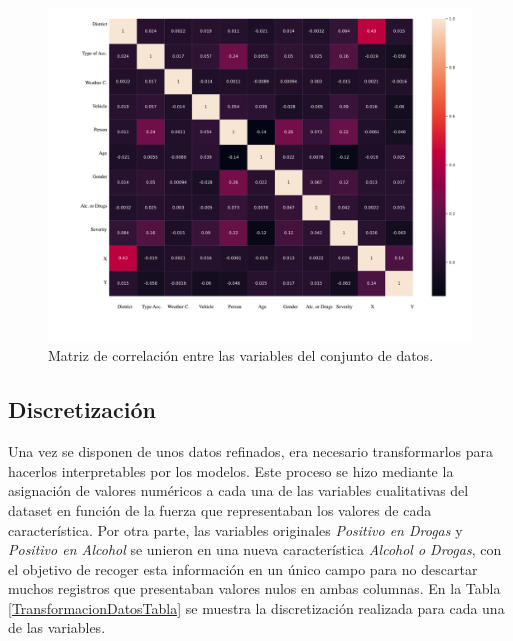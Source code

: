 \begin{figure}[H]
	\centering
	\includegraphics[width=14cm]{Figures/1stPaper/CorrelationMatrix.png}
	\caption{Matriz de correlación entre las variables del conjunto de datos.}
	\label{CorrelationMatrix}
\end{figure}


\subsection*{Discretización}

Una vez se disponen de unos datos refinados, era necesario transformarlos para hacerlos interpretables por los modelos. Este proceso se hizo mediante la asignación de valores numéricos a cada una de las variables cualitativas del dataset en función de la fuerza que representaban los valores de cada característica. Por otra parte, las variables originales \textit{Positivo en Drogas} y \textit{Positivo en Alcohol} se unieron en una nueva característica \textit{Alcohol o Drogas}, con el objetivo de recoger esta información en un único campo para no descartar muchos registros que presentaban valores nulos en ambas columnas. En la Tabla \ref{TransformacionDatosTabla} se muestra la discretización realizada para cada una de las variables.

